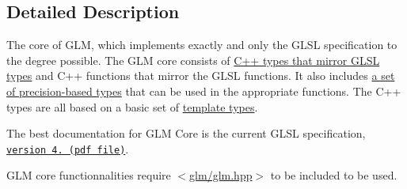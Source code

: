 \subsection{Detailed Description}
The core of G\-L\-M, which implements exactly and only the G\-L\-S\-L specification to the degree possible. The G\-L\-M core consists of \hyperlink{group__core__types}{C++ types that mirror G\-L\-S\-L types} and C++ functions that mirror the G\-L\-S\-L functions. It also includes \hyperlink{group__core__precision}{a set of precision-\/based types} that can be used in the appropriate functions. The C++ types are all based on a basic set of \hyperlink{group__core__template}{template types}.

The best documentation for G\-L\-M Core is the current G\-L\-S\-L specification, \href{http://www.opengl.org/registry/doc/GLSLangSpec.4.20.8.clean.pdf}{\tt version 4. (pdf file)}.

G\-L\-M core functionnalities require $<$\hyperlink{glm_8hpp}{glm/glm.\-hpp}$>$ to be included to be used. 